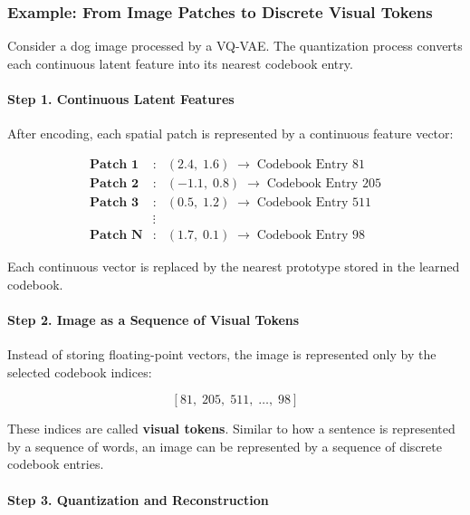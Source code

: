 \subsubsection*{Example: From Image Patches to Discrete Visual Tokens}

Consider a dog image processed by a VQ-VAE. The quantization process converts each continuous latent feature into its nearest codebook entry.

\paragraph{Step 1. Continuous Latent Features}

After encoding, each spatial patch is represented by a continuous feature vector:

\[
\begin{array}{ccl}
\textbf{Patch 1} &:& (2.4,\;1.6)\;\rightarrow\;\text{Codebook Entry }81\\
\textbf{Patch 2} &:& (-1.1,\;0.8)\;\rightarrow\;\text{Codebook Entry }205\\
\textbf{Patch 3} &:& (0.5,\;1.2)\;\rightarrow\;\text{Codebook Entry }511\\
&\vdots&\\
\textbf{Patch N} &:& (1.7,\;0.1)\;\rightarrow\;\text{Codebook Entry }98
\end{array}
\]

Each continuous vector is replaced by the nearest prototype stored in the learned codebook.

\vspace{0.4cm}

\paragraph{Step 2. Image as a Sequence of Visual Tokens}

Instead of storing floating-point vectors, the image is represented only by the selected codebook indices:

\[
\boxed{
[81,\;205,\;511,\;\ldots,\;98]
}
\]

These indices are called \textbf{visual tokens}. Similar to how a sentence is represented by a sequence of words, an image can be represented by a sequence of discrete codebook entries.

\vspace{0.4cm}

\paragraph{Step 3. Quantization and Reconstruction}

